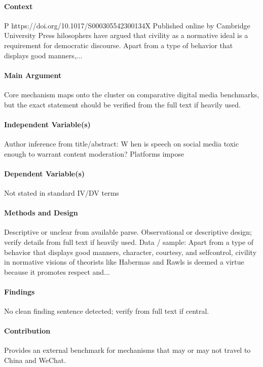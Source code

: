 \documentclass[12pt]{article}
\begin{document}
\paragraph{Context} P https://doi.org/10.1017/S000305542300134X Published online by Cambridge University Press hilosophers have argued that civility as a normative ideal is a requirement for democratic discourse. Apart from a type of behavior that displays good manners,...

\paragraph{Main Argument} Core mechanism maps onto the cluster on comparative digital media benchmarks, but the exact statement should be verified from the full text if heavily used.

\paragraph{Independent Variable(s)} Author inference from title/abstract: W hen is speech on social media toxic enough to warrant content moderation? Platforms impose

\paragraph{Dependent Variable(s)} Not stated in standard IV/DV terms

\paragraph{Methods and Design} Descriptive or unclear from available parse. Observational or descriptive design; verify details from full text if heavily used. Data / sample: Apart from a type of behavior that displays good manners, character, courtesy, and selfcontrol, civility in normative visions of theorists like Habermas and Rawls is deemed a virtue because it promotes respect and...

\paragraph{Findings} No clean finding sentence detected; verify from full text if central.

\paragraph{Contribution} Provides an external benchmark for mechanisms that may or may not travel to China and WeChat.
\end{document}
